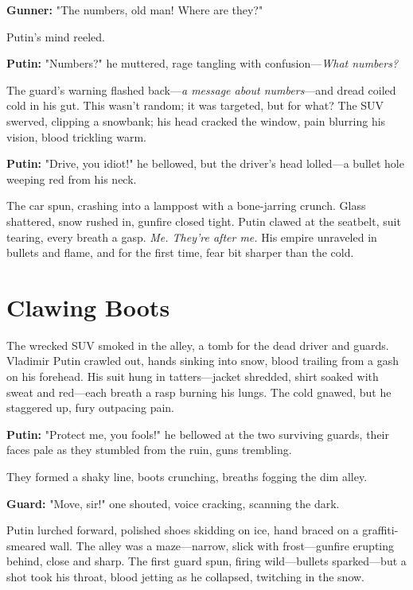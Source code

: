 \documentclass[12pt]{book}
\begin{document}
\vspace{0.5em}
\textbf{Gunner:} "The numbers, old man! Where are they?"

Putin’s mind reeled.

\vspace{0.5em}
\textbf{Putin:} "Numbers?" he muttered, rage tangling with confusion—\emph{What numbers?}

The guard’s warning flashed back—\emph{a message about numbers}—and dread coiled cold in his gut. This wasn’t random; it was targeted, but for what? The SUV swerved, clipping a snowbank; his head cracked the window, pain blurring his vision, blood trickling warm.

\vspace{0.5em}
\textbf{Putin:} "Drive, you idiot!" he bellowed, but the driver’s head lolled—a bullet hole weeping red from his neck.

The car spun, crashing into a lamppost with a bone-jarring crunch. Glass shattered, snow rushed in, gunfire closed tight. Putin clawed at the seatbelt, suit tearing, every breath a gasp. \emph{Me. They’re after me.} His empire unraveled in bullets and flame, and for the first time, fear bit sharper than the cold.

\vspace{1em}

\section{Clawing Boots}

The wrecked SUV smoked in the alley, a tomb for the dead driver and guards. Vladimir Putin crawled out, hands sinking into snow, blood trailing from a gash on his forehead. His suit hung in tatters—jacket shredded, shirt soaked with sweat and red—each breath a rasp burning his lungs. The cold gnawed, but he staggered up, fury outpacing pain.

\vspace{0.5em}
\textbf{Putin:} "Protect me, you fools!" he bellowed at the two surviving guards, their faces pale as they stumbled from the ruin, guns trembling.

They formed a shaky line, boots crunching, breaths fogging the dim alley.

\vspace{0.5em}
\textbf{Guard:} "Move, sir!" one shouted, voice cracking, scanning the dark.

Putin lurched forward, polished shoes skidding on ice, hand braced on a graffiti-smeared wall. The alley was a maze—narrow, slick with frost—gunfire erupting behind, close and sharp. The first guard spun, firing wild—bullets sparked—but a shot took his throat, blood jetting as he collapsed, twitching in the snow.
\end{document}
